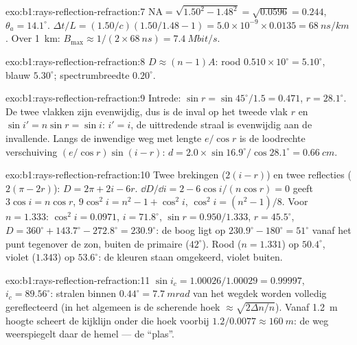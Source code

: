 \begin{solution}{exo:b1:rays-reflection-refraction:7}
$\mathrm{NA} = \sqrt{1.50^2 - 1.48^2} = \sqrt{0.0596} = 0.244$,
$\theta_a = 14.1^\circ$. $\Delta t/L = (1.50/c)(1.50/1.48 - 1) =
5.0\times10^{-9} \times 0.0135 = \qty{68}{ns/km}$. Over \qty{1}{km}:
$B_{\max} \approx 1/(2 \times \qty{68}{ns}) = \qty{7.4}{Mbit/s}$.
\end{solution}

\begin{solution}{exo:b1:rays-reflection-refraction:8}
$D \approx (n - 1)A$: rood $0.510 \times 10^\circ = 5.10^\circ$, blauw
$5.30^\circ$; spectrumbreedte $0.20^\circ$.
\end{solution}

\begin{solution}{exo:b1:rays-reflection-refraction:9}
Intrede: $\sin r = \sin 45^\circ/1.5 = 0.471$, $r = 28.1^\circ$. De twee
vlakken zijn evenwijdig, dus is de inval op het tweede vlak $r$ en
$\sin i' = n\sin r = \sin i$: $i' = i$, de uittredende straal is evenwijdig
aan de invallende. Langs de inwendige weg met lengte $e/\cos r$ is de
loodrechte verschuiving $(e/\cos r)\sin(i - r)$:
$d = 2.0 \times \sin 16.9^\circ/\cos 28.1^\circ = \qty{0.66}{cm}$.
\end{solution}

\begin{solution}{exo:b1:rays-reflection-refraction:10}
Twee brekingen ($2(i - r)$) en twee reflecties ($2(\pi - 2r)$):
$D = 2\pi + 2i - 6r$. $\dd D/\dd i = 2 - 6\cos i/(n\cos r) = 0$ geeft
$3\cos i = n\cos r$, $9\cos^2 i = n^2 - 1 + \cos^2 i$, $\cos^2 i =
(n^2 - 1)/8$. Voor $n = 1.333$: $\cos^2 i = 0.0971$, $i = 71.8^\circ$,
$\sin r = 0.950/1.333$, $r = 45.5^\circ$, $D = 360^\circ + 143.7^\circ -
272.8^\circ = 230.9^\circ$: de boog ligt op $230.9^\circ - 180^\circ =
51^\circ$ vanaf het punt tegenover de zon, buiten de primaire ($42^\circ$).
Rood ($n = 1.331$) op $50.4^\circ$, violet ($1.343$) op $53.6^\circ$:
de kleuren staan omgekeerd, violet buiten.
\end{solution}

\begin{solution}{exo:b1:rays-reflection-refraction:11}
$\sin i_c = 1.00026/1.00029 = 0.99997$, $i_c = 89.56^\circ$: stralen
binnen $0.44^\circ = \qty{7.7}{mrad}$ van het wegdek worden volledig
gereflecteerd (in het algemeen is de scherende hoek $\approx \sqrt{2\Delta n/n}$).
Vanaf \qty{1.2}{m} hoogte scheert de kijklijn onder die hoek voorbij
$1.2/0.0077 \approx \qty{160}{m}$: de weg weerspiegelt daar de hemel ---
de ``plas''.
\end{solution}

